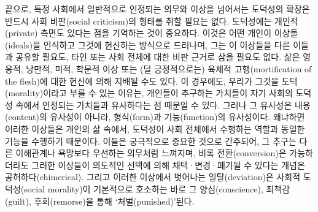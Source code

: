끝으로, 특정 사회에서 일반적으로 인정되는 의무와 이상을 넘어서는
도덕성의 확장은 반드시 사회 비판(social criticism)의 형태를 취할 필요는
없다. 도덕성에는 개인적(private) 측면도 있다는 점을 기억하는 것이
중요하다. 이것은 어떤 개인이 이상들(ideals)을 인식하고 그것에 헌신하는
방식으로 드러나며, 그는 이 이상들을 다른 이들과 공유할 필요도, 타인 또는
사회 전체에 대한 비판 근거로 삼을 필요도 없다. 삶은 영웅적, 낭만적,
미적, 학문적 이상 또는 (덜 긍정적으로는) 육체적 고행(mortification of
the flesh)에 대한 헌신에 의해 지배될 수도 있다. 이 경우에도, 우리가
그것을 도덕(morality)이라고 부를 수 있는 이유는, 개인들이 추구하는
가치들이 자기 사회의 도덕성 속에서 인정되는 가치들과 유사하다는 점
때문일 수 있다. 그러나 그 유사성은 내용(content)의 유사성이 아니라,
형식(form)과 기능(function)의 유사성이다. 왜냐하면 이러한 이상들은
개인의 삶 속에서, 도덕성이 사회 전체에서 수행하는 역할과 동일한 기능을
수행하기 때문이다. 이들은 궁극적으로 중요한 것으로 간주되어, 그 추구는
다른 이해관계나 욕망보다 우선하는 의무처럼 느껴지며, 비록
전환(conversion)은 가능하더라도 그러한 이상들이 의도적인 선택에 의해
채택·변경·폐기될 수 있다는 개념은 공허하다(chimerical). 그리고 이러한
이상에서 벗어나는 일탈(deviation)은 사회적 도덕성(social morality)이
기본적으로 호소하는 바로 그 양심(conscience), 죄책감(guilt),
후회(remorse)을 통해 `처벌(punished)'된다.

\newpage

